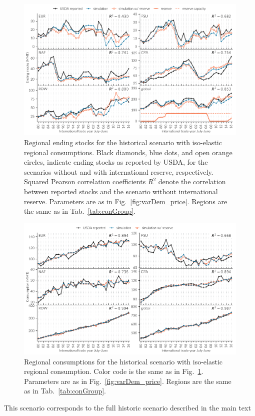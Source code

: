 \begin{figure}[htbp]
  \centering \includegraphics[width=.8\textwidth]{plots/full_var_demand/Ending_stocks__MMT__1980_2017}
  \caption{Regional ending stocks for the historical scenario with iso-elastic regional
    consumptions. Black diamonds, blue dots, and open orange circles, indicate ending stocks as
    reported by USDA, for the scenarios without and with international reserve,
    respectively. Squared Pearson correlation coefficients $R^2$ denote the correlation between
    reported stocks and the scenario without international reserve. Parameters are as in
    Fig.~\ref{fig:varDem_price}. Regions are the same as in Tab.~\ref{tab:conGroup}.}
    \label{fig:varDem_stocks}
\end{figure}
\begin{figure}[htbp]
  \centering  \includegraphics[width=.8\textwidth]{plots/full_var_demand/Consumption__MMT__1980_2017}
  \caption{Regional consumptions for the historical scenario with iso-elastic regional consumption. Color code is the same as in Fig.~\ref{fig:varDem_stocks}. Parameters are as in Fig.~\ref{fig:varDem_price}. Regions are the same as in Tab.~\ref{tab:conGroup}.}
  \label{fig:varDem_cons}
\end{figure}
This scenario corresponds to the full historic scenario described in the main text
